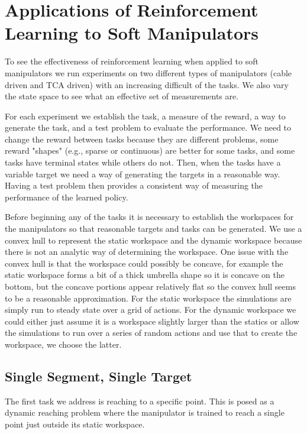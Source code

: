 \documentclass[letterpaper, 10 pt, conference]{ieeeconf}  %
\begin{document}
\section{Applications of Reinforcement Learning to Soft Manipulators}

To see the effectiveness of reinforcement learning when applied to soft manipulators we run experiments on two different types of manipulators (cable driven and TCA driven) with an increasing difficult of the tasks. We also vary the state space to see what an effective set of measurements are. 

For each experiment we establish the task, a measure of the reward, a way to generate the task, and a test problem to evaluate the performance. We need to change the reward between tasks because they are different problems, some reward "shapes" (e.g., sparse or continuous) are better for some tasks, and some tasks have terminal states while others do not. Then, when the tasks have a variable target we need a way of generating the targets in a reasonable way. Having a test problem then provides a consistent way of measuring the performance of the learned policy.

Before beginning any of the tasks it is necessary to establish the workspaces for the manipulators so that reasonable targets and tasks can be generated. We use a convex hull to represent the static workspace and the dynamic workspace because there is not an analytic way of determining the workspace. One issue with the convex hull is that the workspace could possibly be concave, for example the static workspace forms a bit of a thick umbrella shape so it is concave on the bottom, but the concave portions appear relatively flat so the convex hull seems to be a reasonable approximation. For the static workspace the simulations are simply run to steady state over a grid of actions. For the dynamic workspace we could either just assume it is a workspace slightly larger than the statics or allow the simulations to run over a series of random actions and use that to create the workspace, we choose the latter.

\subsection{Single Segment, Single Target}

The first task we address is reaching to a specific point. This is posed as a dynamic reaching problem where the manipulator is trained to reach a single point just outside its static workspace. 
\end{document}
